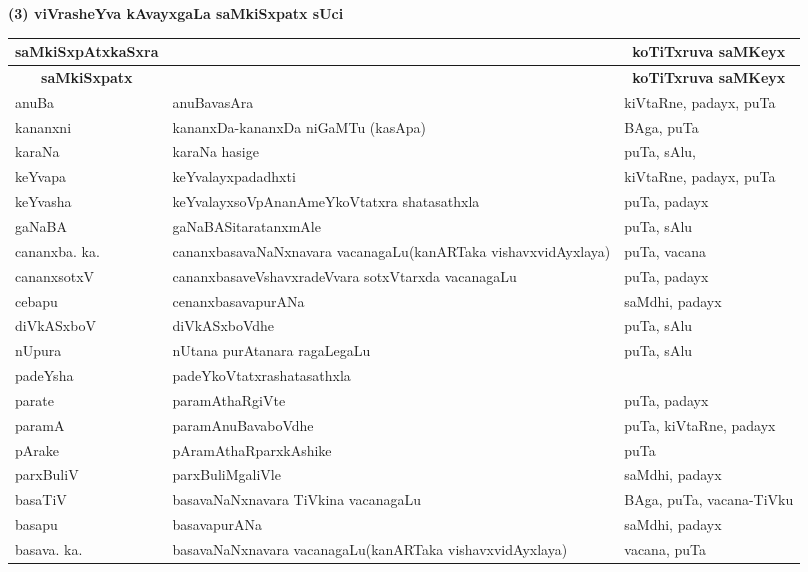 \newpage

\begin{center}
{\large\bf (3) viVrasheYva kAvayxgaLa saMkiSxpatx sUci}
\end{center}

{\renewcommand{\arraystretch}{1.5}
\begin{longtable}{l>{\raggedright}p{7cm}l}
\hline
\multicolumn{1}{c}{\bf saMkiSxpAtxkaSxra} & \multicolumn{1}{c}{\bf kaqtiya hesaru} & \multicolumn{1}{c}{\bf koTiTxruva saMKeyx}\\[3pt]
\hline
\endfirsthead
\hline
\multicolumn{1}{c}{\bf saMkiSxpatx} & \multicolumn{1}{c}{\bf kaqtiya hesaru} & \multicolumn{1}{c}{\bf koTiTxruva saMKeyx}\\[3pt]
\hline
\endhead
\endfoot
\endlastfoot
anuBa & anuBavasAra &  kiVtaRne, padayx, puTa\\
kananxni & kananxDa-kananxDa niGaMTu (kasApa) & BAga, puTa\\
karaNa & karaNa hasige & puTa, sAlu,\\
keYvapa & keYvalayxpadadhxti &  kiVtaRne, padayx, puTa\\
keYvasha & keYvalayxsoVpAnanAmeYkoVtatxra shatasathxla & puTa, padayx\\
gaNaBA & gaNaBASitaratanxmAle & puTa, sAlu\\
cananxba. ka. & cananxbasavaNaNxnavara vacanagaLu\newline (kanARTaka vishavxvidAyxlaya) & puTa, vacana\\
cananxsotxV & cananxbasaveVshavxradeVvara sotxVtarxda vacanagaLu & puTa, padayx\\
cebapu & cenanxbasavapurANa & saMdhi, padayx\\
diVkASxboV & diVkASxboVdhe & puTa, sAlu\\
nUpura & nUtana purAtanara ragaLegaLu & puTa, sAlu\\
padeYsha & padeYkoVtatxrashatasathxla & \\
parate & paramAthaRgiVte & puTa, padayx\\
paramA & paramAnuBavaboVdhe & puTa, kiVtaRne, padayx\\
pArake & pAramAthaRparxkAshike & puTa\\
parxBuliV & parxBuliMgaliVle & saMdhi, padayx\\
basaTiV & basavaNaNxnavara TiVkina vacanagaLu & BAga, puTa, vacana-TiVku\\
basapu & basavapurANa & saMdhi, padayx\\
basava. ka. & basavaNaNxnavara vacanagaLu\newline (kanARTaka vishavxvidAyxlaya) & vacana, puTa\\

\end{longtable}}
